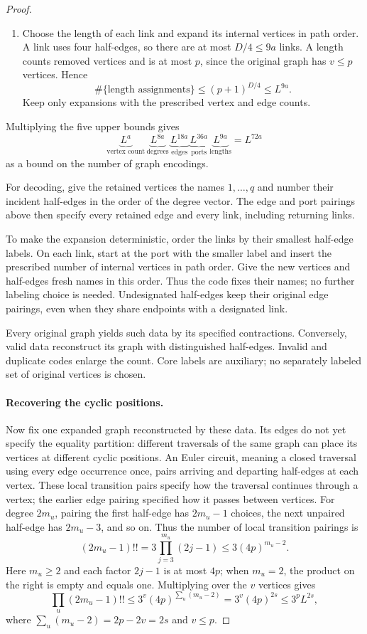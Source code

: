 \documentclass[11pt]{article}
\theoremstyle{definition}
\theoremstyle{remark}
\theoremstyle{plain}
\begin{document}
\begin{proof}
\begin{enumerate}
\item Choose the length of each link and expand its internal
vertices in path order. A link uses four half-edges, so there are
at most $D/4\le9a$ links. A length counts removed vertices and is
at most $p$, since the original graph has $v\le p$ vertices. Hence
\[
 \#\{\text{length assignments}\}\le(p+1)^{D/4}\le L^{9a}.
\]
Keep only expansions with the prescribed vertex and edge counts.
\end{enumerate}
Multiplying the five upper bounds gives
\[
 \underbrace{L^a}_{\text{vertex count}}\,
 \underbrace{L^{8a}}_{\text{degrees}}\,
 \underbrace{L^{18a}}_{\text{edges}}\,
 \underbrace{L^{36a}}_{\text{ports}}\,
 \underbrace{L^{9a}}_{\text{lengths}}
 =L^{72a}
\]
as a bound on the number of graph encodings.

For decoding, give the retained vertices the names $1,\ldots,q$
and number their incident half-edges in the order of the degree
vector. The edge and port pairings above then specify every retained
edge and every link, including returning links.

To make the expansion deterministic, order the links by their
smallest half-edge labels. On each link, start at the port with
the smaller label and insert the prescribed number of internal
vertices in path order. Give the new vertices and half-edges fresh
names in this order. Thus the code fixes their names; no further
labeling choice is needed. Undesignated half-edges keep their original
edge pairings, even when they share endpoints with a designated link.

Every original graph yields such data by its specified contractions.
Conversely, valid data reconstruct its graph with distinguished
half-edges. Invalid and duplicate codes enlarge the count. Core
labels are auxiliary; no separately labeled set of original vertices
is chosen.

\paragraph{Recovering the cyclic positions.}
Now fix one expanded graph reconstructed by these data.
Its edges do not yet specify the equality partition: different
traversals of the same graph can place its vertices at different
cyclic positions. An Euler circuit, meaning a closed traversal
using every edge occurrence once, pairs arriving and departing
half-edges at each vertex. These local transition pairs specify
how the traversal continues through a vertex; the earlier edge
pairing specified how it passes between vertices.
For degree \(2m_u\), pairing the first half-edge has $2m_u-1$
choices, the next unpaired half-edge has $2m_u-3$, and so on.
Thus the number of local transition pairings is
\[
 (2m_u-1)!!=3\prod_{j=3}^{m_u}(2j-1)
                                  \le3(4p)^{m_u-2}.
\]
Here $m_u\ge2$ and each factor $2j-1$ is at most $4p$;
when $m_u=2$, the product on the right is empty and equals one.
Multiplying over the $v$ vertices gives
\[
 \prod_u(2m_u-1)!!
 \le3^v(4p)^{\sum_u(m_u-2)}
 =3^v(4p)^{2s}\le3^pL^{2s},
\]
where $\sum_u(m_u-2)=2p-2v=2s$ and $v\le p$.


\end{proof}
\end{document}
